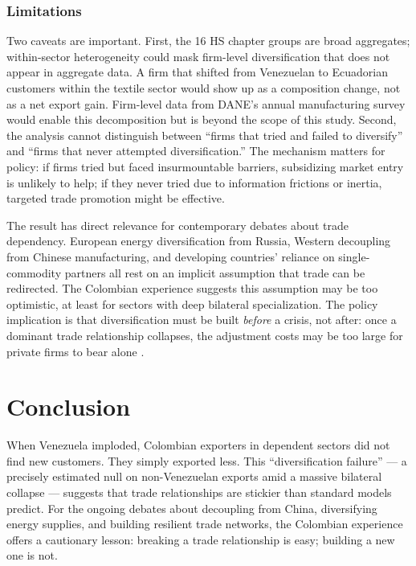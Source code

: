 \documentclass[12pt]{article}
\begin{document}
\subsubsection*{Limitations} Two caveats are important. First, the 16 HS chapter groups are broad aggregates; within-sector heterogeneity could mask firm-level diversification that does not appear in aggregate data. A firm that shifted from Venezuelan to Ecuadorian customers within the textile sector would show up as a composition change, not as a net export gain. Firm-level data from DANE's annual manufacturing survey would enable this decomposition but is beyond the scope of this study. Second, the analysis cannot distinguish between ``firms that tried and failed to diversify'' and ``firms that never attempted diversification.'' The mechanism matters for policy: if firms tried but faced insurmountable barriers, subsidizing market entry is unlikely to help; if they never tried due to information frictions or inertia, targeted trade promotion might be effective.

The result has direct relevance for contemporary debates about trade dependency. European energy diversification from Russia, Western decoupling from Chinese manufacturing, and developing countries' reliance on single-commodity partners all rest on an implicit assumption that trade can be redirected. The Colombian experience suggests this assumption may be too optimistic, at least for sectors with deep bilateral specialization. The policy implication is that diversification must be built \emph{before} a crisis, not after: once a dominant trade relationship collapses, the adjustment costs may be too large for private firms to bear alone \citep{goldberg2010imported}.

\section{Conclusion}

When Venezuela imploded, Colombian exporters in dependent sectors did not find new customers. They simply exported less. This ``diversification failure'' --- a precisely estimated null on non-Venezuelan exports amid a massive bilateral collapse --- suggests that trade relationships are stickier than standard models predict. For the ongoing debates about decoupling from China, diversifying energy supplies, and building resilient trade networks, the Colombian experience offers a cautionary lesson: breaking a trade relationship is easy; building a new one is not.
\end{document}
